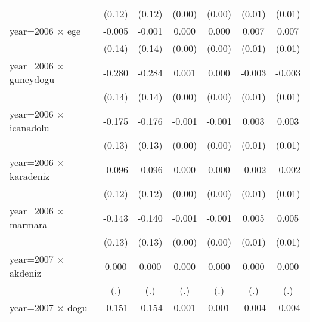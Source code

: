 {\begin{tabular}{l*{6}{c}}
                    &      (0.12)         &      (0.12)         &      (0.00)         &      (0.00)         &      (0.01)         &      (0.01)         \\
year=2006 $\times$ ege&      -0.005         &      -0.001         &       0.000         &       0.000         &       0.007         &       0.007         \\
                    &      (0.14)         &      (0.14)         &      (0.00)         &      (0.00)         &      (0.01)         &      (0.01)         \\
year=2006 $\times$ guneydogu&      -0.280         &      -0.284\sym{*}  &       0.001         &       0.000         &      -0.003         &      -0.003         \\
                    &      (0.14)         &      (0.14)         &      (0.00)         &      (0.00)         &      (0.01)         &      (0.01)         \\
year=2006 $\times$ icanadolu&      -0.175         &      -0.176         &      -0.001         &      -0.001         &       0.003         &       0.003         \\
                    &      (0.13)         &      (0.13)         &      (0.00)         &      (0.00)         &      (0.01)         &      (0.01)         \\
year=2006 $\times$ karadeniz&      -0.096         &      -0.096         &       0.000         &       0.000         &      -0.002         &      -0.002         \\
                    &      (0.12)         &      (0.12)         &      (0.00)         &      (0.00)         &      (0.01)         &      (0.01)         \\
year=2006 $\times$ marmara&      -0.143         &      -0.140         &      -0.001         &      -0.001         &       0.005         &       0.005         \\
                    &      (0.13)         &      (0.13)         &      (0.00)         &      (0.00)         &      (0.01)         &      (0.01)         \\
year=2007 $\times$ akdeniz&       0.000         &       0.000         &       0.000         &       0.000         &       0.000         &       0.000         \\
                    &         (.)         &         (.)         &         (.)         &         (.)         &         (.)         &         (.)         \\
year=2007 $\times$ dogu&      -0.151         &      -0.154         &       0.001         &       0.001         &      -0.004         &      -0.004         \\

\end{tabular}}
